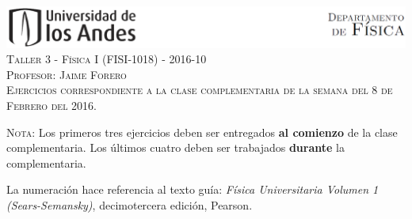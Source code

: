 \documentclass[letterpaper,10pt,onecolumn]{article}
\begin{document}
\begin{center}


\includegraphics[width=490pt]{header.png}\\[0.5cm]

\textsc{\LARGE Taller 3 - F\'isica I (FISI-1018) - 2016-10}\\[0.5cm]

\textsc{\Large{Profesor: Jaime Forero}} \\[0.5cm]

\noindent\textsc{Ejercicios correspondiente a la clase complementaria de la semana del 8 de Febrero del 2016.}\\[0.5cm]
\end{center}

\noindent\textsc{Nota:} 
Los primeros tres ejercicios deben ser
entregados {\bf al comienzo} de la clase complementaria. Los \'ultimos
cuatro deben ser trabajados {\bf durante} la complementaria. 

La numeraci\'on
hace referencia al texto gu\'ia: \textit{F\'isica Universitaria Volumen
  1 (Sears-Semansky)}, decimotercera edici\'on, Pearson.
\end{document}
